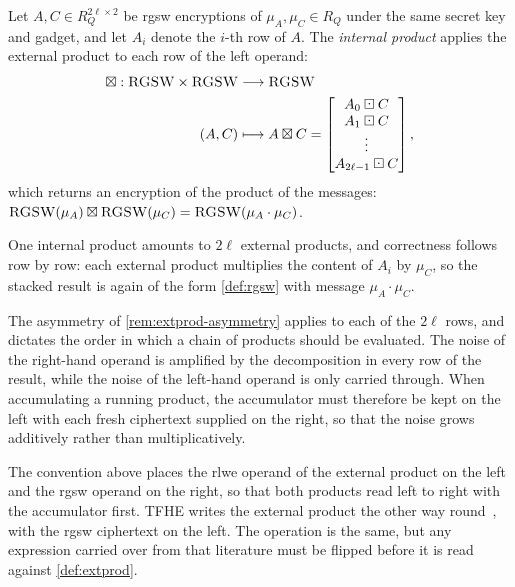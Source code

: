 \begin{definition}
    \label{def:prod:internal}
    Let $A, C \in R_Q^{2\ell\times 2}$ be \gls{rgsw} encryptions of $\mu_A, \mu_C \in R_Q$ under the same secret key and gadget, and let $A_i$ denote the $i$-th row of $A$. The \emph{internal product} applies the external product to each row of the left operand:
    \begin{align}
        \boxtimes: \Call{RGSW}{} \times \Call{RGSW}{} &\longrightarrow \Call{RGSW}{} \nonumber \\
        (A, C) &\longmapsto A \boxtimes C = \begin{bmatrix}
            A_0 \boxdot C \\
            A_1 \boxdot C \\
            \vdots \\
            A_{2\ell - 1} \boxdot C
        \end{bmatrix},
    \end{align}
    which returns an encryption of the product of the messages: $\Call{RGSW}{\mu_A} \boxtimes \Call{RGSW}{\mu_C} = \Call{RGSW}{\mu_A\cdot\mu_C}$.
\end{definition}

One internal product amounts to $2\ell$ external products, and correctness follows row by row: each external product multiplies the content of $A_i$ by $\mu_C$, so the stacked result is again of the form \eqref{def:rgsw} with message $\mu_A\cdot\mu_C$.

The asymmetry of \autoref{rem:extprod-asymmetry} applies to each of the $2\ell$ rows, and dictates the order in which a chain of products should be evaluated. The noise of the right-hand operand is amplified by the decomposition in every row of the result, while the noise of the left-hand operand is only carried through. When accumulating a running product, the accumulator must therefore be kept on the left with each fresh ciphertext supplied on the right, so that the noise grows additively rather than multiplicatively.

\begin{remark}
    \label{rem:operand-order}
    The convention above places the \gls{rlwe} operand of the external product on the left and the \gls{rgsw} operand on the right, so that both products read left to right with the accumulator first. TFHE writes the external product the other way round~\cite{cryptoeprint:2018/421}, with the \gls{rgsw} ciphertext on the left. The operation is the same, but any expression carried over from that literature must be flipped before it is read against \eqref{def:extprod}.
\end{remark}
